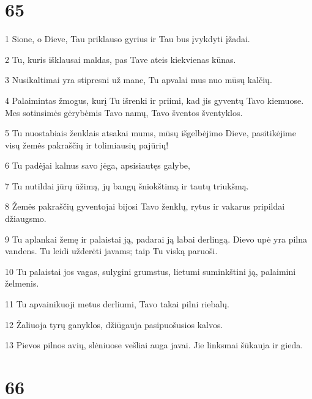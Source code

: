 \chapter{65}


\par 1 Sione, o Dieve, Tau priklauso gyrius ir Tau bus įvykdyti įžadai. 
\par 2 Tu, kuris išklausai maldas, pas Tave ateis kiekvienas kūnas. 
\par 3 Nusikaltimai yra stipresni už mane, Tu apvalai mus nuo mūsų kalčių. 
\par 4 Palaimintas žmogus, kurį Tu išrenki ir priimi, kad jis gyventų Tavo kiemuose. Mes sotinsimės gėrybėmis Tavo namų, Tavo šventos šventyklos. 
\par 5 Tu nuostabiais ženklais atsakai mums, mūsų išgelbėjimo Dieve, pasitikėjime visų žemės pakraščių ir tolimiausių pajūrių! 
\par 6 Tu padėjai kalnus savo jėga, apsisiautęs galybe, 
\par 7 Tu nutildai jūrų ūžimą, jų bangų šniokštimą ir tautų triukšmą. 
\par 8 Žemės pakraščių gyventojai bijosi Tavo ženklų, rytus ir vakarus pripildai džiaugsmo. 
\par 9 Tu aplankai žemę ir palaistai ją, padarai ją labai derlingą. Dievo upė yra pilna vandens. Tu leidi užderėti javams; taip Tu viską paruoši. 
\par 10 Tu palaistai jos vagas, sulygini grumstus, lietumi suminkštini ją, palaimini želmenis. 
\par 11 Tu apvainikuoji metus derliumi, Tavo takai pilni riebalų. 
\par 12 Žaliuoja tyrų ganyklos, džiūgauja pasipuošusios kalvos. 
\par 13 Pievos pilnos avių, slėniuose vešliai auga javai. Jie linksmai šūkauja ir gieda.



\chapter{66}


